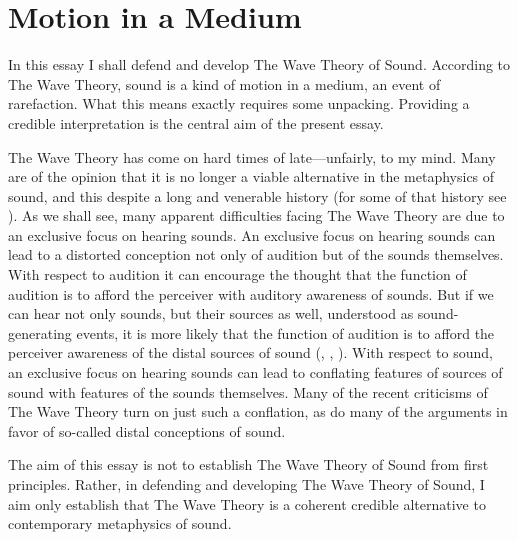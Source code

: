 \documentclass[12pt]{article}
\title{\mytitle}
\author{\myauthor}
\date{} %
\begin{document}
\maketitle

\setlength{\parindent}{1em}


\section{Motion in a Medium} %
\label{sec:motion_in_a_medium}

In this essay I shall defend and develop The Wave Theory of Sound. According to The Wave Theory, sound is a kind of motion in a medium, an event of rarefaction. What this means exactly requires some unpacking. Providing a credible interpretation is the central aim of the present essay.

The Wave Theory has come on hard times of late---unfairly, to my mind. Many are of the opinion that it is no longer a viable alternative in the metaphysics of sound, and this despite a long and venerable history (for some of that history see \citealt{Pasnau:2000aa}). As we shall see, many apparent difficulties facing The Wave Theory are due to an exclusive focus on hearing sounds. An exclusive focus on hearing sounds can lead to a distorted conception not only of audition but of the sounds themselves. With respect to audition it can encourage the thought that the function of audition is to afford the perceiver with auditory awareness of sounds. But if we can hear not only sounds, but their sources as well, understood as sound-generating events, it is more likely that the function of audition is to afford the perceiver awareness of the distal sources of sound (\citealt{Nudds:2009sf}, \citealt{Leddington:2014aa}, \citealt[chapter 4]{Kalderon:2018oe}). With respect to sound, an exclusive focus on hearing sounds can lead to conflating features of sources of sound with features of the sounds themselves. Many of the recent criticisms of The Wave Theory turn on just such a conflation, as do many of the arguments in favor of so-called distal conceptions of sound.

The aim of this essay is not to establish The Wave Theory of Sound from first principles. Rather, in defending and developing The Wave Theory of Sound, I aim only establish that The Wave Theory is a coherent credible alternative to contemporary metaphysics of sound. 
\end{document}
